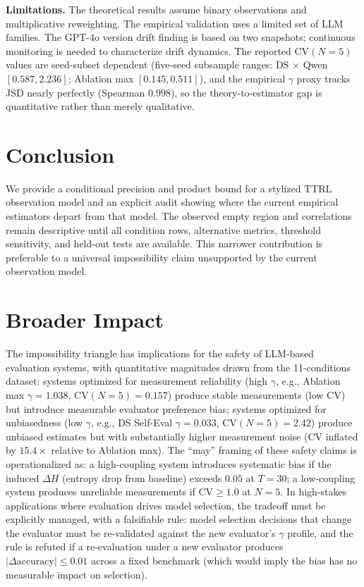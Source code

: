 \documentclass[11pt]{article}
\begin{document}
\textbf{Limitations.} The theoretical results assume binary observations and multiplicative reweighting. The empirical validation uses a limited set of LLM families. The GPT-4o version drift finding is based on two snapshots; continuous monitoring is needed to characterize drift dynamics. The reported $\mathrm{CV}(N{=}5)$ values are seed-subset dependent (five-seed subsample ranges: DS $\times$ Qwen $[0.587, 2.236]$; Ablation max $[0.145, 0.511]$), and the empirical $\gamma$ proxy tracks JSD nearly perfectly (Spearman $0.998$), so the theory-to-estimator gap is quantitative rather than merely qualitative.

\section{Conclusion}

We provide a conditional precision and product bound for a stylized TTRL observation model and an explicit audit showing where the current empirical estimators depart from that model. The observed empty region and correlations remain descriptive until all condition rows, alternative metrics, threshold sensitivity, and held-out tests are available. This narrower contribution is preferable to a universal impossibility claim unsupported by the current observation model.

\section*{Broader Impact}

The impossibility triangle has implications for the safety of LLM-based evaluation systems, with quantitative magnitudes drawn from the 11-conditions dataset: systems optimized for measurement reliability (high $\gamma$, e.g., Ablation max $\gamma = 1.038$, $\mathrm{CV}(N{=}5) = 0.157$) produce stable measurements (low $\mathrm{CV}$) but introduce measurable evaluator preference bias; systems optimized for unbiasedness (low $\gamma$, e.g., DS Self-Eval $\gamma = 0.033$, $\mathrm{CV}(N{=}5) = 2.42$) produce unbiased estimates but with substantially higher measurement noise (CV inflated by $15.4\times$ relative to Ablation max). The ``may'' framing of these safety claims is operationalized as: a high-coupling system introduces systematic bias if the induced $\Delta H$ (entropy drop from baseline) exceeds $0.05$ at $T{=}30$; a low-coupling system produces unreliable measurements if $\mathrm{CV} \geq 1.0$ at $N{=}5$. In high-stakes applications where evaluation drives model selection, the tradeoff must be explicitly managed, with a falsifiable rule: model selection decisions that change the evaluator must be re-validated against the new evaluator's $\gamma$ profile, and the rule is refuted if a re-evaluation under a new evaluator produces $|\Delta\text{accuracy}| \leq 0.01$ across a fixed benchmark (which would imply the bias has no measurable impact on selection).
\end{document}
